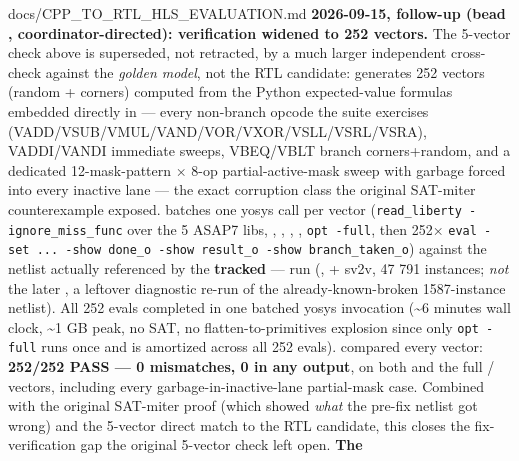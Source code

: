 \begin{relocated}{docs/CPP_TO_RTL_HLS_EVALUATION.md}
\textbf{2026-09-15, follow-up (bead , coordinator-directed):
verification widened to 252 vectors.} The 5-vector check above is
superseded, not retracted, by a much larger independent cross-check
against the \emph{golden model}, not the RTL candidate:
 generates 252 vectors
(random + corners) computed from the Python expected-value formulas
embedded directly in  --- every
non-branch opcode the suite exercises
(VADD/\allowbreak{}VSUB/\allowbreak{}VMUL/\allowbreak{}VAND/\allowbreak{}VOR/\allowbreak{}VXOR/\allowbreak{}VSLL/\allowbreak{}VSRL/\allowbreak{}VSRA),
VADDI/\allowbreak{}VANDI immediate sweeps, VBEQ/VBLT branch
corners+random, and a dedicated 12-mask-pattern × 8-op
partial-active-mask sweep with garbage forced into every inactive lane
--- the exact corruption class the original SAT-miter counterexample
exposed.  batches one yosys
 call per vector
(\texttt{read\_\allowbreak{}liberty\ -\allowbreak{}ignore\_\allowbreak{}miss\_\allowbreak{}func}
over the 5 ASAP7  libs, ,
, , ,
\texttt{opt\ -\allowbreak{}full}, then 252×
\texttt{eval\ -\allowbreak{}set\ .\allowbreak{}.\allowbreak{}.\allowbreak{}\ -\allowbreak{}show\ done\_\allowbreak{}o\ -\allowbreak{}show\ result\_\allowbreak{}o\ -\allowbreak{}show\ branch\_\allowbreak{}taken\_\allowbreak{}o})
against the netlist actually referenced by the \textbf{tracked}
 --- run
(, 
+ sv2v, 47 791 instances; \emph{not} the later
, a leftover 
diagnostic re-run of the already-known-broken 1587-instance netlist).
All 252 evals completed in one batched yosys invocation
(\textasciitilde6 minutes wall clock, \textasciitilde1 GB peak, no SAT,
no flatten-to-primitives explosion since only
\texttt{opt\ -\allowbreak{}full} runs once and is amortized across all
252 evals).  compared every
vector: \textbf{252/252 PASS --- 0 mismatches, 0  in any
output}, on both  and the full
/ vectors, including every
garbage-in-inactive-lane partial-mask case. Combined with the original
SAT-miter proof (which showed \emph{what} the pre-fix netlist got wrong)
and the 5-vector direct match to the RTL candidate, this closes the
fix-verification gap the original 5-vector check left open. \textbf{The
}
\end{relocated}
